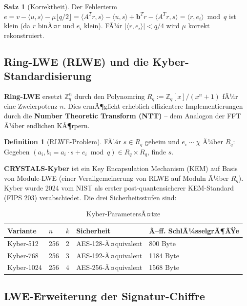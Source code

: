 ﻿\documentclass[a4paper,12pt]{scrreprt}
\theoremstyle{definition}
\newtheorem{definition}{Definition}[section]
\newtheorem{satz}{Satz}[section]
\begin{document}
\begin{satz}[Korrektheit]
Der Fehlerterm $e = v - \langle u, s\rangle - \mu\lfloor q/2\rfloor = \langle A^Tr, s\rangle - \langle u,s\rangle + \mathbf{b}^Tr - \langle A^Tr,s\rangle = \langle r, e_i\rangle \bmod q$ ist klein (da $r$ binÃ¤r und $e_i$ klein). FÃ¼r $|\langle r,e_i\rangle| < q/4$ wird $\mu$ korrekt rekonstruiert.
\end{satz}

\subsection{Ring-LWE (RLWE) und die Kyber-Standardisierung}

\textbf{Ring-LWE} \cite{LPR10} ersetzt $\mathbb{Z}_q^n$ durch den Polynomring $R_q := \mathbb{Z}_q[x]/(x^n+1)$ fÃ¼r eine Zweierpotenz $n$. Dies ermÃ¶glicht erheblich effizientere Implementierungen durch die \textbf{Number Theoretic Transform (NTT)} -- dem Analogon der FFT Ã¼ber endlichen KÃ¶rpern.

\begin{definition}[RLWE-Problem]
FÃ¼r $s \in R_q$ geheim und $e_i \sim \chi$ Ã¼ber $R_q$: Gegeben $(a_i, b_i = a_i \cdot s + e_i \bmod q) \in R_q \times R_q$, finde $s$.
\end{definition}

\textbf{CRYSTALS-Kyber} \cite{ABD+22} ist ein Key Encapsulation Mechanism (KEM) auf Basis von Module-LWE (einer Verallgemeinerung von RLWE auf Moduln Ã¼ber $R_q$). Kyber wurde 2024 vom NIST \cite{NIST22} als erster post-quantensicherer KEM-Standard (FIPS 203) verabschiedet. Die drei Sicherheitsstufen sind:

\begin{table}[ht]
\centering
\caption{Kyber-ParametersÃ¤tze}
\begin{tabular}{@{}lllll@{}}
\toprule
\textbf{Variante} & \textbf{$n$} & \textbf{$k$} & \textbf{Sicherheit} & \textbf{Ã–ff. SchlÃ¼sselgrÃ¶ÃŸe} \\
\midrule
Kyber-512  & 256 & 2 & AES-128-Ã¤quivalent & 800 Byte \\
Kyber-768  & 256 & 3 & AES-192-Ã¤quivalent & 1184 Byte \\
Kyber-1024 & 256 & 4 & AES-256-Ã¤quivalent & 1568 Byte \\
\bottomrule
\end{tabular}
\end{table}

\subsection{LWE-Erweiterung der Signatur-Chiffre}
\end{document}
